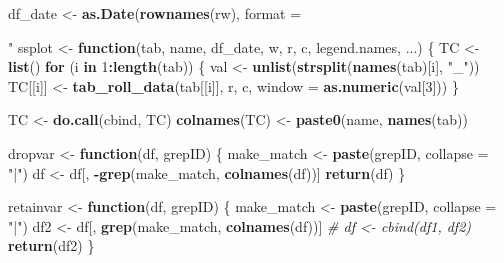 \documentclass[]{elsarticle} %
\newenvironment{Shaded}{\begin{snugshade}}{\end{snugshade}}
\newcommand{\KeywordTok}[1]{\textcolor[rgb]{0.13,0.29,0.53}{\textbf{#1}}}
\newcommand{\DataTypeTok}[1]{\textcolor[rgb]{0.13,0.29,0.53}{#1}}
\newcommand{\DecValTok}[1]{\textcolor[rgb]{0.00,0.00,0.81}{#1}}
\newcommand{\StringTok}[1]{\textcolor[rgb]{0.31,0.60,0.02}{#1}}
\newcommand{\CommentTok}[1]{\textcolor[rgb]{0.56,0.35,0.01}{\textit{#1}}}
\newcommand{\ControlFlowTok}[1]{\textcolor[rgb]{0.13,0.29,0.53}{\textbf{#1}}}
\newcommand{\OperatorTok}[1]{\textcolor[rgb]{0.81,0.36,0.00}{\textbf{#1}}}
\newcommand{\NormalTok}[1]{#1}
\begin{document}
\begin{Shaded}
\begin{Highlighting}[]
\NormalTok{df_date <-}\StringTok{ }\KeywordTok{as.Date}\NormalTok{(}\KeywordTok{rownames}\NormalTok{(rw), }\DataTypeTok{format =} \StringTok{"%
\NormalTok{ssplot <-}\StringTok{ }\ControlFlowTok{function}\NormalTok{(tab, name, df_date, w, r, c, legend.names, ...) \{}
\NormalTok{    TC <-}\StringTok{ }\KeywordTok{list}\NormalTok{()}
    \ControlFlowTok{for}\NormalTok{ (i }\ControlFlowTok{in} \DecValTok{1}\OperatorTok{:}\KeywordTok{length}\NormalTok{(tab)) \{}
\NormalTok{        val <-}\StringTok{ }\KeywordTok{unlist}\NormalTok{(}\KeywordTok{strsplit}\NormalTok{(}\KeywordTok{names}\NormalTok{(tab)[i], }\StringTok{"_"}\NormalTok{))}
\NormalTok{        TC[[i]] <-}\StringTok{ }\KeywordTok{tab_roll_data}\NormalTok{(tab[[i]], r, c, }\DataTypeTok{window =} \KeywordTok{as.numeric}\NormalTok{(val[}\DecValTok{3}\NormalTok{]))}
\NormalTok{    \}}
    
\NormalTok{    TC <-}\StringTok{ }\KeywordTok{do.call}\NormalTok{(cbind, TC)}
    \KeywordTok{colnames}\NormalTok{(TC) <-}\StringTok{ }\KeywordTok{paste0}\NormalTok{(name, }\KeywordTok{names}\NormalTok{(tab))}
    
\NormalTok{    dropvar <-}\StringTok{ }\ControlFlowTok{function}\NormalTok{(df, grepID) \{}
\NormalTok{        make_match <-}\StringTok{ }\KeywordTok{paste}\NormalTok{(grepID, }\DataTypeTok{collapse =} \StringTok{"|"}\NormalTok{)}
\NormalTok{        df <-}\StringTok{ }\NormalTok{df[, }\OperatorTok{-}\KeywordTok{grep}\NormalTok{(make_match, }\KeywordTok{colnames}\NormalTok{(df))]}
        \KeywordTok{return}\NormalTok{(df)}
\NormalTok{    \}}
    
\NormalTok{    retainvar <-}\StringTok{ }\ControlFlowTok{function}\NormalTok{(df, grepID) \{}
\NormalTok{        make_match <-}\StringTok{ }\KeywordTok{paste}\NormalTok{(grepID, }\DataTypeTok{collapse =} \StringTok{"|"}\NormalTok{)}
\NormalTok{        df2 <-}\StringTok{ }\NormalTok{df[, }\KeywordTok{grep}\NormalTok{(make_match, }\KeywordTok{colnames}\NormalTok{(df))]}
        \CommentTok{# df <- cbind(df1, df2)}
        \KeywordTok{return}\NormalTok{(df2)}
\NormalTok{    \}}
    
}
\end{Highlighting}
\end{Shaded}
\end{document}
